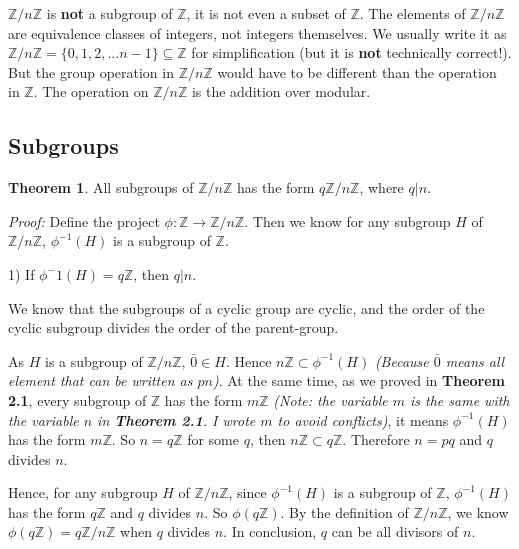 \documentclass{article}
\theoremstyle{definition}
\newtheorem{theorem}{Theorem}[section]
\begin{document}
$\mathbb{Z}/n\mathbb{Z}$ is \textbf{not} a subgroup of $\mathbb{Z}$, it is not even a subset of $\mathbb{Z}$. The elements of $\mathbb{Z}/n\mathbb{Z}$ are equivalence classes of integers, not integers themselves. We usually write it as $\mathbb{Z}/n\mathbb{Z}=\{0,1,2,...n-1\} \subseteq \mathbb{Z}$ for simplification (but it is \textbf{not} technically correct!). But the group operation in $\mathbb{Z}/n\mathbb{Z}$ would have to be different than the operation in $\mathbb{Z}$. The operation on $\mathbb{Z}/n\mathbb{Z}$ is the addition over modular.

\subsection{Subgroups}

\begin{theorem}
All subgroups of $\mathbb{Z}/n\mathbb{Z}$ has the form $q\mathbb{Z}/n\mathbb{Z}$, where $q|n$.

\textit{Proof:} Define the project $\phi: \mathbb{Z} \to \mathbb{Z}/n\mathbb{Z}$. Then we know for any subgroup $H$ of $\mathbb{Z}/n\mathbb{Z}$, $\phi^{-1}(H)$ is a subgroup of $\mathbb{Z}$.

1) If $\phi^-1(H)=q\mathbb{Z}$, then $q|n$.

We know that the subgroups of a cyclic group are cyclic, and the order of the cyclic subgroup divides the order of the parent-group.

As $H$ is a subgroup of $\mathbb{Z}/n\mathbb{Z}$, $\bar{0} \in H $. Hence $n\mathbb{Z} \subset \phi^{-1}(H)$ \textit{(Because $\bar{0}$ means all element that can be written as $pn$)}. At the same time, as we proved in \textbf{Theorem 2.1}, every subgroup of $\mathbb{Z}$ has the form $m\mathbb{Z}$ \textit{(Note: the variable $m$ is the same with the variable $n$ in \textbf{Theorem 2.1}. I wrote $m$ to avoid conflicts)}, it means $\phi^{-1}(H)$ has the form $m\mathbb{Z}$. So $n=q\mathbb{Z}$ for some $q$, then $n\mathbb{Z} \subset q \mathbb{Z}$. Therefore $n=pq$ and $q$ divides $n$.

Hence, for any subgroup $H$ of $\mathbb{Z}/n\mathbb{Z}$, since $\phi^{-1}(H)$ is a subgroup of $\mathbb{Z}$, $\phi^{-1}(H)$ has the form $q\mathbb{Z}$ and $q$ divides $n$. So $\phi(q\mathbb{Z})$. By the definition of $\mathbb{Z}/n\mathbb{Z}$, we know $\phi(q\mathbb{Z})=q\mathbb{Z}/n\mathbb{Z}$ when $q$ divides $n$. In conclusion, $q$ can be all divisors of $n$.

\end{theorem}
\end{document}
